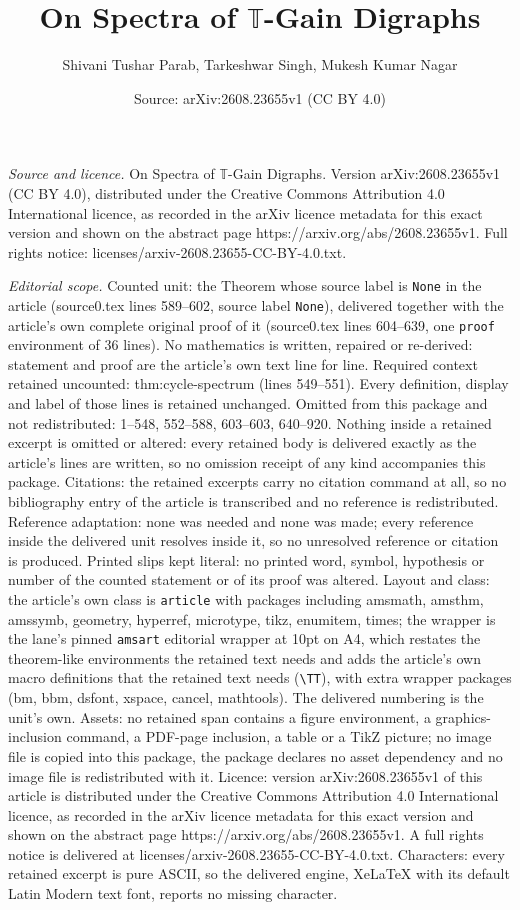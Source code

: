 \documentclass[10pt,a4paper]{amsart}
\title[On Spectra of $\mathbb{T}$-Gain Digraphs]{On Spectra of $\mathbb{T}$-Gain Digraphs}
\author{Shivani Tushar Parab, Tarkeshwar Singh, Mukesh Kumar Nagar}
\date{Source: arXiv:2608.23655v1 (CC BY 4.0)}
\begin{document}
\maketitle

\noindent\emph{Source and licence.} On Spectra of $\mathbb{T}$-Gain Digraphs. Version arXiv:2608.23655v1 (CC BY 4.0), distributed under the Creative Commons Attribution 4.0 International licence, as recorded in the arXiv licence metadata for this exact version and shown on the abstract page https://arxiv.org/abs/2608.23655v1. Full rights notice: licenses/arxiv-2608.23655-CC-BY-4.0.txt.\par\smallskip

\noindent\textit{Editorial scope.} Counted unit: the Theorem whose source label is \texttt{None} in the article (source0.tex lines 589--602, source label \texttt{None}), delivered together with the article's own complete original proof of it (source0.tex lines 604--639, one \texttt{proof} environment of 36 lines). No mathematics is written, repaired or re-derived: statement and proof are the article's own text line for line. Required context retained uncounted: thm:cycle-spectrum (lines 549--551). Every definition, display and label of those lines is retained unchanged. Omitted from this package and not redistributed: 1--548, 552--588, 603--603, 640--920. Nothing inside a retained excerpt is omitted or altered: every retained body is delivered exactly as the article's lines are written, so no omission receipt of any kind accompanies this package. Citations: the retained excerpts carry no citation command at all, so no bibliography entry of the article is transcribed and no reference is redistributed. Reference adaptation: none was needed and none was made; every reference inside the delivered unit resolves inside it, so no unresolved reference or citation is produced. Printed slips kept literal: no printed word, symbol, hypothesis or number of the counted statement or of its proof was altered. Layout and class: the article's own class is \texttt{article} with packages including amsmath, amsthm, amssymb, geometry, hyperref, microtype, tikz, enumitem, times; the wrapper is the lane's pinned \texttt{amsart} editorial wrapper at 10pt on A4, which restates the theorem-like environments the retained text needs and adds the article's own macro definitions that the retained text needs (\texttt{\textbackslash TT}), with extra wrapper packages (bm, bbm, dsfont, xspace, cancel, mathtools). The delivered numbering is the unit's own. Assets: no retained span contains a figure environment, a graphics-inclusion command, a PDF-page inclusion, a table or a TikZ picture; no image file is copied into this package, the package declares no asset dependency and no image file is redistributed with it. Licence: version arXiv:2608.23655v1 of this article is distributed under the Creative Commons Attribution 4.0 International licence, as recorded in the arXiv licence metadata for this exact version and shown on the abstract page https://arxiv.org/abs/2608.23655v1. A full rights notice is delivered at licenses/arxiv-2608.23655-CC-BY-4.0.txt. Characters: every retained excerpt is pure ASCII, so the delivered engine, XeLaTeX with its default Latin Modern text font, reports no missing character.
\end{document}
